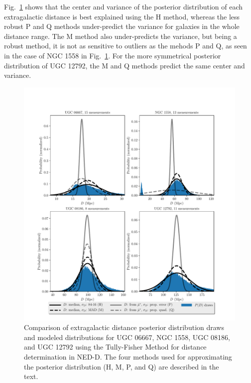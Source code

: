 \documentclass[a4paper,fleqn,usenatbib]{mnras}
\begin{document}
Fig.~\ref{fig:comp} shows that the center and variance of the posterior distribution of each extragalactic distance is best explained using the H method, whereas the less robust P and Q methods under-predict the variance for galaxies in the whole distance range. The M method also under-predicts the variance, but being a robust method, it is not as sensitive to outliers as the mehods P and Q, as seen in the case of NGC 1558 in Fig.~\ref{fig:comp}. For the more symmetrical posterior distribution of UGC 12792, the M and Q methods predict the same center and variance. \\

\begin{figure}

	\includegraphics[scale=0.7]{comp}
    \caption{Comparison of extragalactic distance posterior distribution draws and modeled distributions for UGC 06667, NGC 1558, UGC 08186, and UGC 12792 using the Tully-Fisher Method for distance determination in NED-D. The four methods used for approximating the posterior distribution (H, M, P, and Q) are described in the text. }
    \label{fig:comp}
\end{figure}
\end{document}
